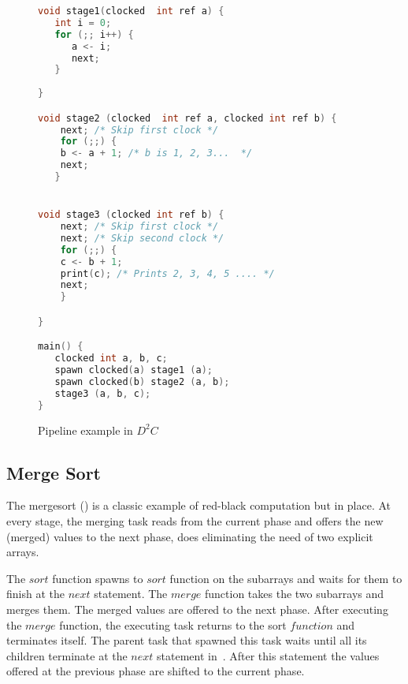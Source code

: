 \documentclass[10pt, conference, compsocconf]{IEEEtran}
\begin{document}
\begin{figure}[htbp]
\begin{lstlisting}[language=C]
void stage1(clocked  int ref a) {
   int i = 0;
   for (;; i++) {
      a <- i;
      next;
   }
      
}

void stage2 (clocked  int ref a, clocked int ref b) {
    next; /* Skip first clock */
    for (;;) {
	b <- a + 1; /* b is 1, 2, 3...  */ 
	next;
   }


void stage3 (clocked int ref b) {
    next; /* Skip first clock */
    next; /* Skip second clock */
    for (;;) {
	c <- b + 1;
 	print(c); /* Prints 2, 3, 4, 5 .... */
	next; 
    }

}

main() {
   clocked int a, b, c; 
   spawn clocked(a) stage1 (a);
   spawn clocked(b) stage2 (a, b);
   stage3 (a, b, c);
}
\end{lstlisting}
\caption{Pipeline example in $D^2C$}
\label{fig:pipeline}
\end{figure}


\subsection{Merge Sort}
\label{sec:mergesort}

The mergesort () is a classic example of red-black computation
but in place.
At every stage, the merging task reads from the current phase
and offers the new (merged) values to the next phase, does
eliminating the need of two explicit arrays.

The $sort$ function spawns to $sort$ function on the subarrays
and waits for them to finish at the $next$ statement.
The $merge$ function takes the two subarrays and merges them.
The merged values are offered to the next phase. 
After executing  the $merge$ function, the executing task
 returns to the sort $function$ and terminates
itself.  The parent task that spawned this task waits until all its children
terminate at the $next$ statement in~. After this statement
the values offered at the previous phase are shifted to the current phase.
\end{document}
